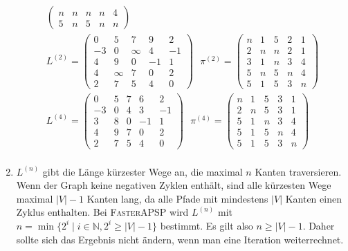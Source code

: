 \documentclass[11pt,a4paper]{article}
\begin{document}
\begin{loesung}
\begin{enumerate}
\begin{align*}
\begin{pmatrix}
                n & n & n & n & 4 \\
                5 & n & 5 & n & n
            \end{pmatrix}
            \\
            L^{(2)} = 
            \begin{pmatrix}
                0 & 5 & 7 & 9 & 2 \\
                -3 & 0 & \infty & 4 & -1 \\
                4 & 9 & 0 & -1 & 1 \\
                4 & \infty & 7 & 0 & 2 \\
                2 & 7 & 5 & 4 & 0
            \end{pmatrix}
            \,\,\,\,
            \pi^{(2)} = 
            \begin{pmatrix}
                n & 1 & 5 & 2 & 1 \\
                2 & n & n & 2 & 1 \\
                3 & 1 & n & 3 & 4 \\
                5 & n & 5 & n & 4 \\
                5 & 1 & 5 & 3 & n
            \end{pmatrix}
            \\
            L^{(4)} =
            \begin{pmatrix}
                0 & 5 & 7 & 6 & 2 \\
                -3 & 0 & 4 & 3 & -1 \\
                3 & 8 & 0 & -1 & 1 \\
                4 & 9 & 7 & 0 & 2 \\
                2 & 7 & 5 & 4 & 0
            \end{pmatrix}
            \,\,\,\,
            \pi^{(4)} =
            \begin{pmatrix}
                n & 1 & 5 & 3 & 1 \\
                2 & n & 5 & 3 & 1 \\
                5 & 1 & n & 3 & 4 \\
                5 & 1 & 5 & n & 4 \\
                5 & 1 & 5 & 3 & n
            \end{pmatrix}
            \\
        \end{align*}
        \item
        $L^{(n)}$ gibt die Länge kürzester Wege an, die maximal $n$ Kanten traversieren.
        Wenn der Graph keine negativen Zyklen enthält, sind alle kürzesten Wege maximal $|V| - 1$ Kanten lang, da alle Pfade mit mindestens $|V|$ Kanten einen Zyklus enthalten.
        Bei \textsc{FasterAPSP} wird $L^{(n)}$ mit $n = \min\{2^i \mid i \in \mathbb{N}, 2^i \geq |V| - 1\}$ bestimmt.
        Es gilt also $n \geq |V| - 1$.
        Daher sollte sich das Ergebnis nicht ändern, wenn man eine Iteration weiterrechnet.
        

\end{enumerate}
\end{loesung}
\end{document}
